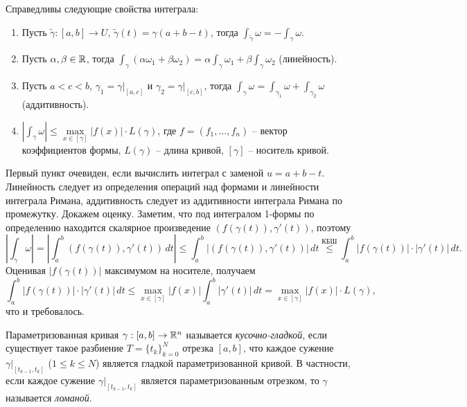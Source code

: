 \begin{proposition}
	Справедливы следующие свойства интеграла: 
	\begin{enumerate}[itemsep = 0pt, topsep = 5pt]
	\item Пусть $\widetilde{\gamma} : [a, b] \to U$, $\widetilde{\gamma}(t) = \gamma(a + b - t)$, тогда $\int_{\widetilde{\gamma}} \omega = - \int_{\gamma} \omega$. %
	\item Пусть $\alpha, \beta \in \mathbb{R}$, тогда $\int_{\gamma} (\alpha \omega_1 + \beta \omega_2) = \alpha \int_{\gamma} \omega_1 + \beta \int_{\gamma} \omega_2$ (линейность).
	\item Пусть $a < c < b$, $\gamma_1 = \gamma|_{[a, c]}$ и $\gamma_2 = \gamma|_{[c, b]}$, тогда $\int_{\gamma} \omega = \int_{\gamma_1} \omega + \int_{\gamma_2} \omega$ (аддитивность).
	\item $\left|\int_{\gamma} \omega\right| \leq \max \limits_{x \in [\gamma]} |f(x)| \cdot L(\gamma)$, где $f = (f_1, \dotsc, f_n)$ -- вектор коэффициентов формы, $L(\gamma)$ -- длина кривой, $[\gamma]$ -- носитель кривой.
\end{enumerate}
\end{proposition}

\begin{myproof}
	Первый пункт очевиден, если вычислить интеграл с заменой $u = a + b - t$.
	Линейность следует из определения операций над формами и линейности интеграла Римана, аддитивность следует из аддитивности интеграла Римана по промежутку.
	Докажем оценку.
	Заметим, что под интегралом 1-формы по определению находится скалярное произведение $(f(\gamma(t)), \gamma'(t))$, поэтому
	\[ \left| \int_{\gamma} \omega \right| = \left| \int_a^b (f(\gamma(t)), \gamma'(t)) \, dt \right| \leq \int_a^b |(f(\gamma(t)), \gamma'(t))| \, dt \overset{\text{КБШ}}{\leq} \int_a^b |f(\gamma(t))| \cdot |\gamma'(t)| \, dt. \]
	Оценивая $|f(\gamma(t))|$ максимумом на носителе, получаем
	\[ \int_a^b |f(\gamma(t))| \cdot |\gamma'(t)| \, dt \leq \max \limits_{x \in [\gamma]} |f(x)| \int_a^b |\gamma'(t)| \, dt = \max \limits_{x \in [\gamma]} |f(x)| \cdot L(\gamma), \]
	что и требовалось.
\end{myproof}

\begin{reminder}
	Параметризованная кривая $\gamma : [a, b] \to \mathbb{R}^n$ называется \textit{кусочно-гладкой}, если существует такое разбиение $T = \{t_k\}_{k=0}^N$ отрезка $[a, b]$, что каждое сужение $\gamma|_{[t_{k-1}, t_k]}$ ($1 \leq k \leq N$) является гладкой параметризованной кривой. %
В частности, если каждое сужение $\gamma|_{[t_{k-1}, t_k]}$ является параметризованным отрезком, то $\gamma$ называется \textit{ломаной}. 
\end{reminder}

